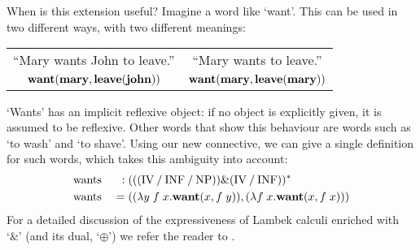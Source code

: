 When is this extension useful? Imagine a word like `want'. This can be
used in two different ways, with two different meanings:\\
\begin{center}
  \vspace{-1\baselineskip}
  \renewcommand{\arraystretch}{1}
  \begin{tabular}{c c}
    ``Mary wants John to leave.'' & ``Mary wants to leave.''\\
    $\WANT(\MARY,\LEAVE(\JOHN))$  & $\WANT(\MARY,\LEAVE(\MARY))$
  \end{tabular}
\end{center}
`Wants' has an implicit reflexive object: if no object is explicitly
given, it is assumed to be reflexive. Other words that show this
behaviour are words such as `to wash' and `to shave'.
Using our new connective, we can give a single definition for such
words, which takes this ambiguity into account:
\begin{alignat*}{3}
  &\text{wants}\;&:\;&\tr[(((\IV\impl\INF\impl\NP))\&(\IV\impl\INF))]\\
  &\text{wants}\;&=\;&((\lambda y\;f\;x.\WANT(x,f\;y)),(\lambda f\;x.\WANT(x,f\;x)))
\end{alignat*}
For a detailed discussion of the expressiveness of Lambek calculi
enriched with `\&' (and its dual, `$\oplus$') we refer the reader to
\citet{kanazawa1992}.

%
